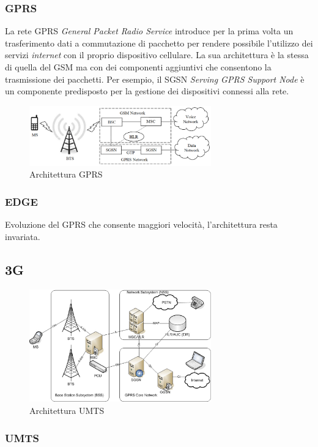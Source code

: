 \subsubsection{GPRS}
La rete GPRS \textit{General Packet Radio Service} introduce per la prima volta un trasferimento dati a commutazione di pacchetto per rendere 
possibile l'utilizzo dei servizi \textit{internet} con il proprio dispositivo cellulare.
La sua architettura è la stessa di quella del GSM ma con dei componenti aggiuntivi che consentono la trasmissione dei pacchetti. 
Per esempio, il SGSN \textit{Serving GPRS Support Node} è un componente predisposto per la gestione dei dispositivi connessi alla rete.
\begin{figure}[ht]
    \centering
    \includegraphics[width=0.7\textwidth]{images/2g-gprs.png}
    \caption{Architettura GPRS}
\end{figure}
\subsubsection{EDGE}
Evoluzione del GPRS che consente maggiori velocità, l'architettura resta invariata.

\subsection{3G}
\begin{figure}[ht]
    \centering
    \includegraphics[width=0.7\textwidth]{images/3g-umts.png}
    \caption{Architettura UMTS}
\end{figure}

\subsubsection{UMTS}



